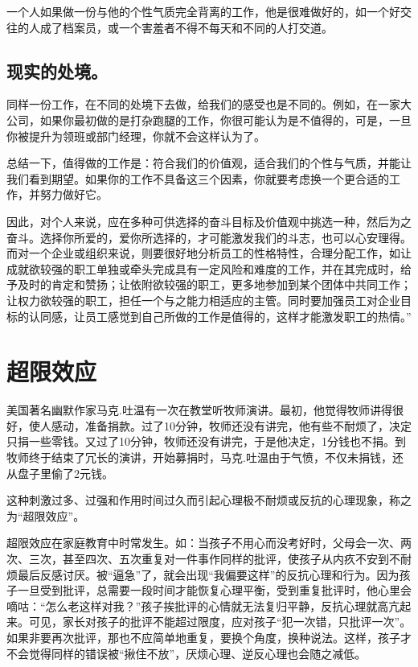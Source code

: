 \documentclass[11pt]{ctexart}
\begin{document}
一个人如果做一份与他的个性气质完全背离的工作，他是很难做好的，如一个好交往的人成了档案员，或一个害羞者不得不每天和不同的人打交道。
\subsection{现实的处境。}
\label{sec-17-3}


同样一份工作，在不同的处境下去做，给我们的感受也是不同的。例如，在一家大公司，如果你最初做的是打杂跑腿的工作，你很可能认为是不值得的，可是，一旦你被提升为领班或部门经理，你就不会这样认为了。

总结一下，值得做的工作是：符合我们的价值观，适合我们的个性与气质，并能让我们看到期望。如果你的工作不具备这三个因素，你就要考虑换一个更合适的工作，并努力做好它。

因此，对个人来说，应在多种可供选择的奋斗目标及价值观中挑选一种，然后为之奋斗。选择你所爱的，爱你所选择的，才可能激发我们的斗志，也可以心安理得。而对一个企业或组织来说，则要很好地分析员工的性格特性，合理分配工作，如让成就欲较强的职工单独或牵头完成具有一定风险和难度的工作，并在其完成时，给予及时的肯定和赞扬；让依附欲较强的职工，更多地参加到某个团体中共同工作；让权力欲较强的职工，担任一个与之能力相适应的主管。同时要加强员工对企业目标的认同感，让员工感觉到自己所做的工作是值得的，这样才能激发职工的热情。”
\section{超限效应}
\label{sec-18}


美国著名幽默作家马克.吐温有一次在教堂听牧师演讲。最初，他觉得牧师讲得很好，使人感动，准备捐款。过了10分钟，牧师还没有讲完，他有些不耐烦了，决定只捐一些零钱。又过了10分钟，牧师还没有讲完，于是他决定，1分钱也不捐。到牧师终于结束了冗长的演讲，开始募捐时，马克.吐温由于气愤，不仅未捐钱，还从盘子里偷了2元钱。

这种刺激过多、过强和作用时间过久而引起心理极不耐烦或反抗的心理现象，称之为“超限效应”。

超限效应在家庭教育中时常发生。如：当孩子不用心而没考好时，父母会一次、两次、三次，甚至四次、五次重复对一件事作同样的批评，使孩子从内疚不安到不耐烦最后反感讨厌。被“逼急”了，就会出现“我偏要这样”的反抗心理和行为。因为孩子一旦受到批评，总需要一段时间才能恢复心理平衡，受到重复批评时，他心里会嘀咕：“怎么老这样对我？”孩子挨批评的心情就无法复归平静，反抗心理就高亢起来。可见，家长对孩子的批评不能超过限度，应对孩子“犯一次错，只批评一次”。如果非要再次批评，那也不应简单地重复，要换个角度，换种说法。这样，孩子才不会觉得同样的错误被“揪住不放”，厌烦心理、逆反心理也会随之减低。
\end{document}
